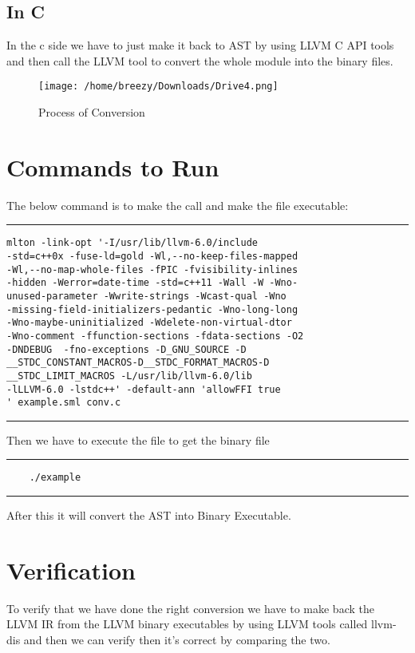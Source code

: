 \documentclass{book}
\begin{document}
\subsection{In C}
In the c side we have to just make it back to AST by using LLVM C API tools and then call  the LLVM tool to convert the whole module into the binary files.\newline

\begin{figure}[h]
	\texttt{[image: /home/breezy/Downloads/Drive4.png]}
	\caption{Process of Conversion}
	\label{fig:4.1}
\end{figure} \newpage

\section{Commands to Run}
The below command is to make the call and make the file executable: \newline
\noindent\rule{12cm}{0.4pt}

\begin{verbatim}
mlton -link-opt '-I/usr/lib/llvm-6.0/include
-std=c++0x -fuse-ld=gold -Wl,--no-keep-files-mapped
-Wl,--no-map-whole-files -fPIC -fvisibility-inlines
-hidden -Werror=date-time -std=c++11 -Wall -W -Wno-
unused-parameter -Wwrite-strings -Wcast-qual -Wno
-missing-field-initializers-pedantic -Wno-long-long
-Wno-maybe-uninitialized -Wdelete-non-virtual-dtor 
-Wno-comment -ffunction-sections -fdata-sections -O2
-DNDEBUG  -fno-exceptions -D_GNU_SOURCE -D
__STDC_CONSTANT_MACROS-D__STDC_FORMAT_MACROS-D
__STDC_LIMIT_MACROS -L/usr/lib/llvm-6.0/lib 
-lLLVM-6.0 -lstdc++' -default-ann 'allowFFI true
' example.sml conv.c
\end{verbatim}
\noindent\rule{12cm}{0.4pt}\newline \newline

Then we have to execute the file to get the binary file

\noindent\rule{12cm}{0.4pt}

\begin{verbatim}
	./example
\end{verbatim}

\noindent\rule{12cm}{0.4pt}

After this it will convert the AST into Binary Executable.

\newpage

\section{Verification}
To verify that we have done the right conversion we have to make back the LLVM IR from the LLVM binary executables by using LLVM tools called llvm-dis and then we can verify then it's correct by comparing the two.
\end{document}
